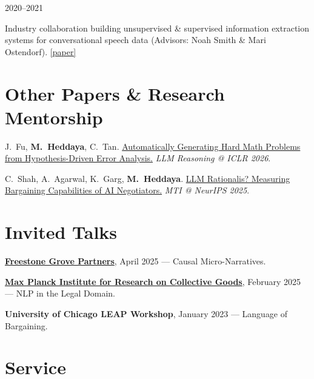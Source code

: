 \documentclass[11pt,letterpaper]{article}
\begin{document}
\vspace{4pt}
 \hfill 2020--2021
\begin{cvitems}
    \item Industry collaboration building unsupervised \& supervised information extraction systems for conversational speech data (Advisors: Noah Smith \& Mari Ostendorf). \href{https://arxiv.org/abs/2205.12967}{[paper]}
\end{cvitems}

\section*{Other Papers \& Research Mentorship}

\begin{cvitems}
    \item J.\ Fu, \textbf{M.\ Heddaya}, C.\ Tan. \href{https://openreview.net/forum?id=d1PcXKaAON}{Automatically Generating Hard Math Problems from Hypothesis-Driven Error Analysis.} \textit{LLM Reasoning @ ICLR 2026}.
    \item C.\ Shah, A.\ Agarwal, K.\ Garg, \textbf{M.\ Heddaya}. \href{https://neurips.cc/virtual/2025/loc/san-diego/128019}{LLM Rationalis? Measuring Bargaining Capabilities of AI Negotiators.} \textit{MTI @ NeurIPS 2025}.
\end{cvitems}

\section*{Invited Talks}

\href{https://fgrovep.com}{\textbf{Freestone Grove Partners}}, April 2025 --- Causal Micro-Narratives.

\vspace{4pt}

\href{https://www.coll.mpg.de}{\textbf{Max Planck Institute for Research on Collective Goods}}, February 2025 --- NLP in the Legal Domain.

\vspace{4pt}

\textbf{University of Chicago LEAP Workshop}, January 2023 --- Language of Bargaining.

\section*{Service}
\end{document}
